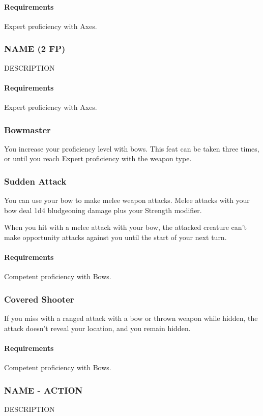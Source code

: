     \paragraph{Requirements} Expert proficiency with Axes.
\subsubsection{NAME (2 FP)} \label{feat::name}
    DESCRIPTION
    \paragraph{Requirements} Expert proficiency with Axes.
\subsubsection{Bowmaster} \label{feat::bowmaster}
    You increase your proficiency level with bows.
    This feat can be taken three times, or until you reach Expert proficiency with the weapon type.
\subsubsection{Sudden Attack} \label{feat::suddenattack}
    You can use your bow to make melee weapon attacks.
    Melee attacks with your bow deal 1d4 bludgeoning damage plus your Strength modifier.

    When you hit with a melee attack with your bow, the attacked creature can't make opportunity attacks against you until the start of your next turn.
    \paragraph{Requirements} Competent proficiency with Bows.
\subsubsection{Covered Shooter} \label{feat::coveredshooter}
    If you miss with a ranged attack with a bow or thrown weapon while hidden, the attack doesn't reveal your location, and you remain hidden.
    \paragraph{Requirements} Competent proficiency with Bows.
\subsubsection{NAME - ACTION} \label{feat::name}
    DESCRIPTION
